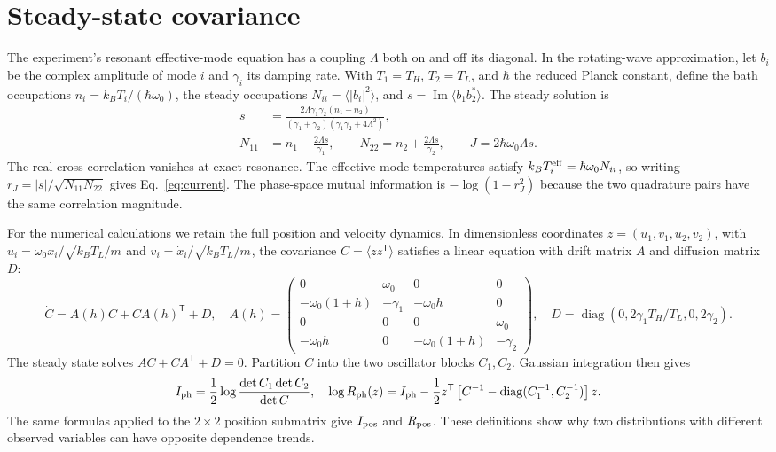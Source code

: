 \documentclass[10pt]{article}
\begin{document}
\section{Steady-state covariance}\label{app:steady}
The experiment's resonant effective-mode equation has a coupling $\Lambda$ both on and off its diagonal.\cite{yang2020} In the rotating-wave approximation, let $b_i$ be the complex amplitude of mode $i$ and $\gamma_i$ its damping rate. With $T_1=T_H$, $T_2=T_L$, and $\hbar$ the reduced Planck constant, define the bath occupations $n_i=k_BT_i/(\hbar\omega_0)$, the steady occupations $N_{ii}=\langle|b_i|^2\rangle$, and $s=\operatorname{Im}\langle b_1b_2^*\rangle$. The steady solution is
\begin{align}
 s&=\frac{2\Lambda\gamma_1\gamma_2(n_1-n_2)}
 {(\gamma_1+\gamma_2)(\gamma_1\gamma_2+4\Lambda^2)},\nonumber\\
 N_{11}&=n_1-\frac{2\Lambda s}{\gamma_1},\qquad
 N_{22}=n_2+\frac{2\Lambda s}{\gamma_2},\qquad
 J=2\hbar\omega_0\Lambda s .
 \label{eq:rwa}
\end{align}
The real cross-correlation vanishes at exact resonance. The effective mode temperatures satisfy $k_BT_i^{\rm eff}=\hbar\omega_0N_{ii}$, so writing $r_J=|s|/\sqrt{N_{11}N_{22}}$ gives Eq.~\eqref{eq:current}. The phase-space mutual information is $-\log(1-r_J^2)$ because the two quadrature pairs have the same correlation magnitude.

For the numerical calculations we retain the full position and velocity dynamics. In dimensionless coordinates $z=(u_1,v_1,u_2,v_2)$, with $u_i=\omega_0x_i/\sqrt{k_BT_L/m}$ and $v_i=\dot x_i/\sqrt{k_BT_L/m}$, the covariance $C=\langle zz^{\mathsf T}\rangle$ satisfies a linear equation with drift matrix $A$ and diffusion matrix $D$:
\begin{equation}
 \dot C=A(h)C+CA(h)^{\mathsf T}+D,\quad
 A(h)=\begin{pmatrix}
 0&\omega_0&0&0\\
 -\omega_0(1+h)&-\gamma_1&-\omega_0h&0\\
 0&0&0&\omega_0\\
 -\omega_0h&0&-\omega_0(1+h)&-\gamma_2
 \end{pmatrix},\quad
 D=\operatorname{diag}(0,2\gamma_1T_H/T_L,0,2\gamma_2).
 \label{eq:covode}
\end{equation}
The steady state solves $AC+CA^{\mathsf T}+D=0$. Partition $C$ into the two oscillator blocks $C_1,C_2$. Gaussian integration then gives
\begin{equation}
 I_{\rm ph}=\frac12\log\frac{\det C_1\det C_2}{\det C},\quad
 \log R_{\rm ph}(z)=I_{\rm ph}
 -\frac12z^{\mathsf T}
 \left[C^{-1}-\operatorname{diag}(C_1^{-1},C_2^{-1})\right]z .
 \label{eq:gaussianratio}
\end{equation}
The same formulas applied to the $2\times2$ position submatrix give $I_{\rm pos}$ and $R_{\rm pos}$. These definitions show why two distributions with different observed variables can have opposite dependence trends.
\end{document}
